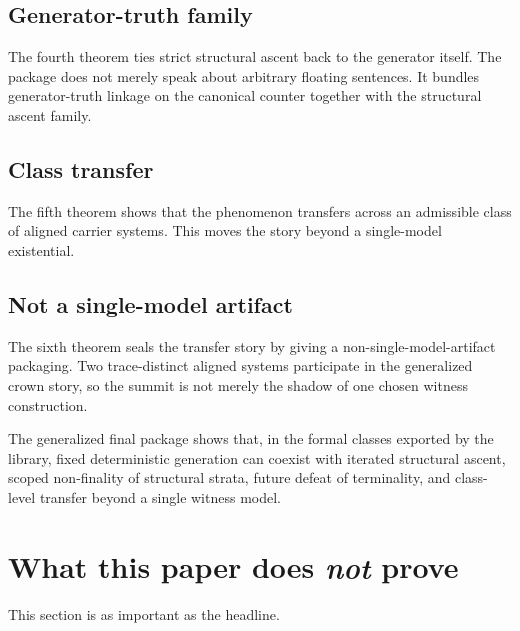 \documentclass[11pt,a4paper]{article}
\newenvironment{keybox}[1]{%
  \Needspace*{8\baselineskip}%
  \begin{tcolorbox}[
    enhanced, breakable=false,
    colback=blue!5, colframe=blue!45!black, coltitle=black,
    colbacktitle=blue!14, boxrule=0.85pt, arc=2.5pt,
    left=9pt, right=9pt, top=6pt, bottom=6pt,
    titlerule=0.55pt, fonttitle=\bfseries, title={#1},
    before upper=\raggedright,
    before skip=0.9\baselineskip, after skip=0.9\baselineskip
  ]%
}{%
  \end{tcolorbox}%
}
\theoremstyle{definition}
\begin{document}
\subsection{Generator-truth family}

The fourth theorem ties strict structural ascent back to the generator itself. The package does not merely speak about arbitrary floating sentences. It bundles generator-truth linkage on the canonical counter together with the structural ascent family.

\subsection{Class transfer}

The fifth theorem shows that the phenomenon transfers across an admissible class of aligned carrier systems. This moves the story beyond a single-model existential.

\subsection{Not a single-model artifact}

The sixth theorem seals the transfer story by giving a non-single-model-artifact packaging. Two trace-distinct aligned systems participate in the generalized crown story, so the summit is not merely the shadow of one chosen witness construction.

\begin{keybox}{The paper's central reading}
The generalized final package shows that, in the formal classes exported by the library, fixed deterministic generation can coexist with iterated structural ascent, scoped non-finality of structural strata, future defeat of terminality, and class-level transfer beyond a single witness model.
\end{keybox}

\section{What this paper does \emph{not} prove}\label{sec:not-prove}

This section is as important as the headline.
\end{document}
